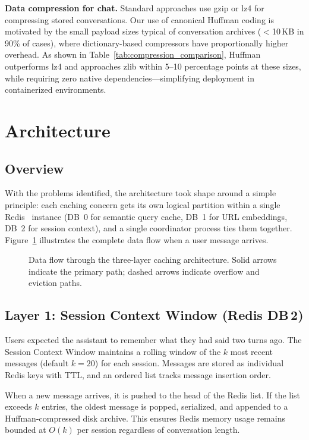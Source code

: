 \documentclass[conference]{IEEEtran}
\begin{document}
\textbf{Data compression for chat.}
Standard approaches use gzip or lz4 for compressing stored conversations. Our use of canonical Huffman coding is motivated by the small payload sizes typical of conversation archives ($<$10\,KB in 90\% of cases), where dictionary-based compressors have proportionally higher overhead. As shown in Table~\ref{tab:compression_comparison}, Huffman outperforms lz4 and approaches zlib within 5--10 percentage points at these sizes, while requiring zero native dependencies---simplifying deployment in containerized environments.

\section{Architecture}
\label{sec:architecture}

\subsection{Overview}

With the problems identified, the architecture took shape around a simple 
principle: each caching concern gets its own logical partition within a single Redis~\cite{redis2023} instance (DB~0 for semantic query cache, DB~1 for URL embeddings, DB~2 for session context), and a single coordinator process ties them together. Figure~\ref{fig:architecture} illustrates 
the complete data flow when a user message arrives.

\begin{figure}[t]
\centering

\caption{Data flow through the three-layer caching architecture. Solid arrows indicate the primary path; dashed arrows indicate overflow and eviction paths.}
\label{fig:architecture}
\end{figure}

\subsection{Layer 1: Session Context Window (Redis DB\,2)}

Users expected the assistant to remember what they had said two turns ago. The Session Context Window maintains a rolling window of the $k$ most recent messages (default $k{=}20$) for each session. Messages are stored as individual Redis keys with TTL, and an ordered list tracks message insertion order.

When a new message arrives, it is pushed to the head of the Redis list. If the list exceeds $k$ entries, the oldest message is popped, serialized, and appended to a Huffman-compressed disk archive. This ensures Redis memory usage remains bounded at $O(k)$ per session regardless of conversation length.
\end{document}
